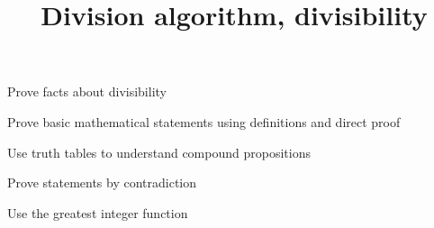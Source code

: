 \documentclass{../ximera}
\title{Division algorithm, divisibility}
\begin{document}
\begin{abstract}
\end{abstract}
\maketitle


\begin{obj}
  \item Prove facts about divisibility
  \item Prove basic mathematical statements using definitions and direct proof
  \item Use truth tables to understand compound propositions
  \item Prove statements by contradiction
  \item Use the greatest integer function
\end{obj}
 
\end{document}

